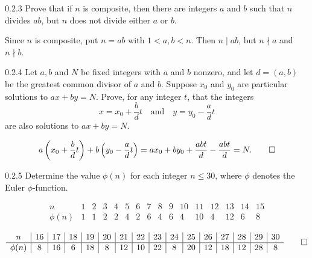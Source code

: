 \begin{exercise}{0.2.3}
    Prove that if $n$ is composite, then there are integers $a$ and $b$ such that $n$ divides $ab$, but $n$ does not divide either $a$ or $b$.
\end{exercise}

\begin{sol}
    Since $n$ is composite, put $n = ab$ with $1 < a, b < n$.
	Then $n \mid ab$, but $n \nmid a$ and $n \nmid b$.
\end{sol}

\begin{exercise}{0.2.4}
    Let $a, b$ and $N$ be fixed integers with $a$ and $b$ nonzero, and let $d = (a, b)$ be the greatest common divisor of $a$ and $b$.
	Suppose $x_0$ and $y_0$ are particular solutions to $ax + by = N$.
	Prove, for any integer $t$, that the integers
    \[
    	x = x_0 + \frac bdt \quad \text{and} \quad y = y_0 - \frac adt
    \]
    are also solutions to $ax + by = N$.


\end{exercise}

\begin{sol}
    \[
        a\left(x_0 + \frac bdt\right) + b\left(y_0 - \frac adt\right) = ax_0 + by_0 + \frac{abt}{d} - \frac{abt}{d} = N. \qedhere
    \]
\end{sol}

\begin{exercise}{0.2.5}
    Determine the value $\phi(n)$ for each integer $n \leq 30$, where $\phi$ denotes the Euler $\phi$-function.
\end{exercise}

\begin{sol}
    \[
        \begin{array}{c|c|c|c|c|c|c|c|c|c|c|c|c|c|c|c}
            n & 1 & 2 & 3 & 4 & 5 & 6 & 7 & 8 & 9 & 10 & 11 & 12 & 13 & 14 & 15 \\
            \hline
            \phi(n) & 1 & 1 & 2 & 2 & 4 & 2 & 6 & 4 & 6 & 4 & 10 & 4 & 12 & 6 & 8 \\
        \end{array}
    \]
    \[
        \begin{array}{c|c|c|c|c|c|c|c|c|c|c|c|c|c|c|c}
            n & 16 & 17 & 18 & 19 & 20 & 21 & 22 & 23 & 24 & 25 & 26 & 27 & 28 & 29 & 30 \\
            \hline
            \phi(n) & 8 & 16 & 6 & 18 & 8 & 12 & 10 & 22 & 8 & 20 & 12 & 18 & 12 & 28 & 8 \\
        \end{array} \qedhere
    \]
\end{sol}

